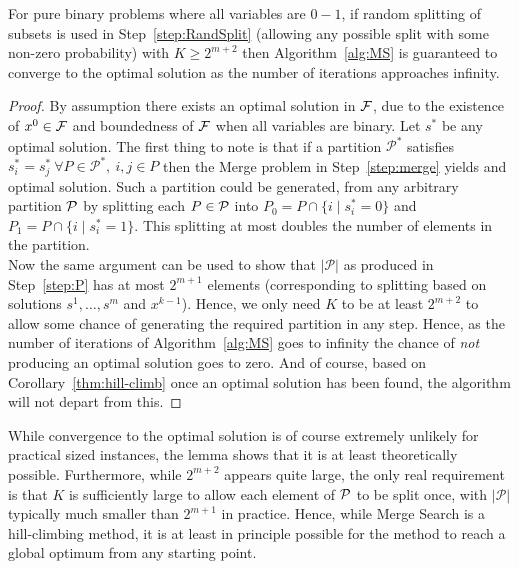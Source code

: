 \documentclass[preprint]{elsarticle}
\begin{document}
\begin{lemma}\label{thm:optimal}
  For pure binary problems where all variables are $0-1$, if random splitting of subsets is used in Step~\ref{step:RandSplit} (allowing any possible split with some non-zero probability) with $K\ge 2^{m+2}$ then Algorithm~\ref{alg:MS} is guaranteed to converge to the optimal solution as the number of iterations approaches infinity. 
\end{lemma}
\begin{proof}
  By assumption there exists an optimal solution in $\cal F$, due to the existence of $x^0\in\cal F$ and boundedness of $\cal F$ when all variables are binary. Let $s^*$ be any optimal solution. The first thing to note is that if a partition $\mathcal{P}^*$ satisfies $s^*_i=s^*_j\ \forall P\in \mathcal{P}^*,\ i,j\in P$ then the Merge problem in Step~\ref{step:merge} yields and optimal solution. 
  Such a partition could be generated, from any arbitrary partition $\cal P$ by splitting each $P\in\cal P$ into $P_0=P\cap \{i\mid s^*_i=0\}$ and $P_1=P\cap \{i\mid s^*_i=1\}$. This splitting at most doubles the number of elements in the partition. \\
  Now the same argument can be used to show that $|\mathcal{P}|$ as produced in Step~\ref{step:P} has at most $2^{m+1}$ elements (corresponding to splitting based on solutions $s^1,\ldots,s^m$ and $x^{k-1}$). Hence, we only need $K$ to be at least $2^{m+2}$ to allow some chance of generating the required partition in any step. Hence, as the number of iterations of Algorithm~\ref{alg:MS} goes to infinity the chance of \emph{not} producing an optimal solution goes to zero. And of course, based on Corollary~\ref{thm:hill-climb} once an optimal solution has been found, the algorithm will not depart from this.
\end{proof}
While convergence to the optimal solution is of course extremely unlikely for practical sized instances, the lemma shows that it is at least theoretically possible. Furthermore, while $2^{m+2}$ appears quite large, the only real requirement is that $K$ is sufficiently large to allow each element of $\cal P$ to be split once, with $|\mathcal{P}|$ typically much smaller than $2^{m+1}$ in practice. Hence, while Merge Search is a hill-climbing method, it is at least in principle possible for the method to reach a global optimum from any starting point.
\end{document}
